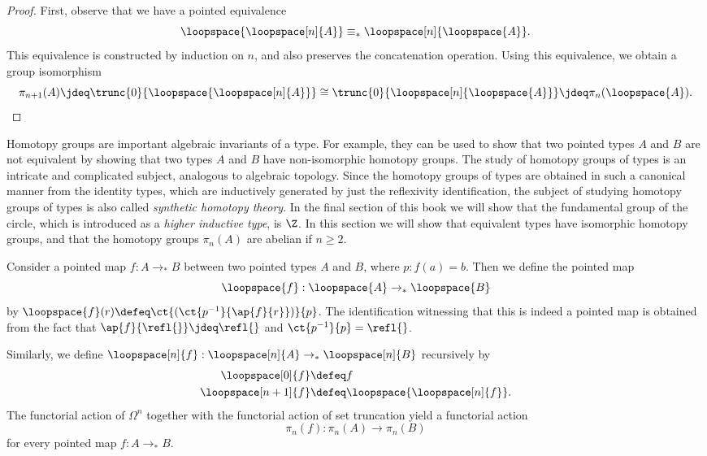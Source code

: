 \begin{proof}
  First, observe that we have a pointed equivalence
  \begin{equation*}
    \loopspace{\loopspace[n]{A}}\equiv_\ast\loopspace[n]{\loopspace{A}}.
  \end{equation*}
  This equivalence is constructed by induction on $n$, and also preserves the concatenation operation. Using this equivalence, we obtain a group isomorphism
  \begin{equation*}
    \pi_{n+1}(A)\jdeq \trunc{0}{\loopspace{\loopspace[n]{A}}}\cong\trunc{0}{\loopspace[n]{\loopspace{A}}} \jdeq \pi_n(\loopspace{A}).\qedhere
  \end{equation*}
\end{proof}

Homotopy groups are important algebraic invariants of a type. For example, they can be used to show that two pointed types $A$ and $B$ are not equivalent by showing that two types $A$ and $B$ have non-isomorphic homotopy groups. The study of homotopy groups of types is an intricate and complicated subject, analogous to algebraic topology. Since the homotopy groups of types are obtained in such a canonical manner from the identity types, which are inductively generated by just the reflexivity identification, the subject of studying homotopy groups of types is also called \emph{synthetic homotopy theory}. In the final section of this book we will show that the fundamental group of the circle, which is introduced as a \emph{higher inductive type}, is $\Z$. In this section we will show that equivalent types have isomorphic homotopy groups, and that the homotopy groups $\pi_n(A)$ are abelian if $n\geq 2$.

\begin{defn}
  Consider a pointed map $f:A\to_\ast B$ between two pointed types $A$ and $B$, where $p:f(a)=b$. Then we define the pointed map
  \begin{equation*}
    \loopspace{f}:\loopspace{A}\to_\ast\loopspace{B}
  \end{equation*}
  by $\loopspace{f}(r)\defeq \ct{(\ct{p^{-1}}{\ap{f}{r}})}{p}$. The identification witnessing that this is indeed a pointed map is obtained from the fact that $\ap{f}{\refl{}}\jdeq\refl{}$ and $\ct{p^{-1}}{p}=\refl{}$.

  Similarly, we define $\loopspace[n]{f}:\loopspace[n]{A}\to_\ast\loopspace[n]{B}$ recursively by
  \begin{align*}
    \loopspace[0]{f} & \defeq f \\
    \loopspace[n+1]{f} & \defeq \loopspace{\loopspace[n]{f}}.
  \end{align*}
  The functorial action of $\Omega^n$ together with the functorial action of set truncation yield a functorial action
  \begin{equation*}
    \pi_n(f):\pi_n(A)\to\pi_n(B)
  \end{equation*}
  for every pointed map $f:A\to_\ast B$. 
\end{defn}

